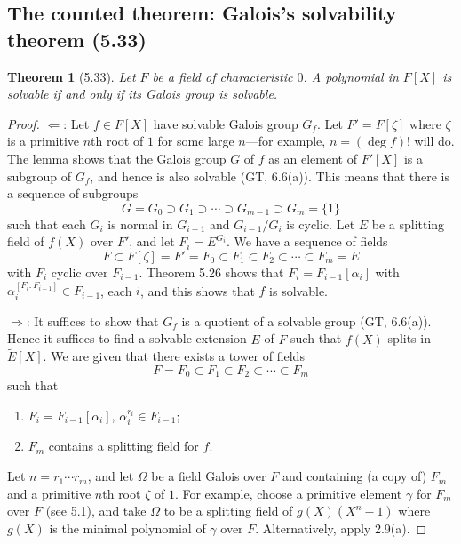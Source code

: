 \documentclass[UTF8,11pt,a4paper]{ctexart}
\newtheorem*{theorem}{Theorem}
\theoremstyle{definition}\newtheorem*{definition}{Definition}
\theoremstyle{remark}\newtheorem*{remark}{Remark}
\begin{document}
\subsection*{The counted theorem: Galois's solvability theorem (5.33)}
\begin{theorem}[5.33]
Let $F$ be a field of characteristic $0$. A polynomial in $F[X]$ is solvable if and only if its Galois group is solvable.
\end{theorem}
\begin{proof}
$\Longleftarrow$: Let $f\in F[X]$ have solvable Galois group $G_f$. Let $F'=F[\zeta]$ where $\zeta$ is a primitive $n$th root of $1$ for some large $n$---for example, $n=(\deg f)!$ will do. The lemma shows that the Galois group $G$ of $f$ as an element of $F'[X]$ is a subgroup of $G_f$, and hence is also solvable (GT, 6.6(a)). This means that there is a sequence of subgroups
\[
G=G_0\supset G_1\supset\cdots\supset G_{m-1}\supset G_m=\{1\}
\]
such that each $G_i$ is normal in $G_{i-1}$ and $G_{i-1}/G_i$ is cyclic. Let $E$ be a splitting field of $f(X)$ over $F'$, and let $F_i=E^{G_i}$. We have a sequence of fields
\[
F\subset F[\zeta]=F'=F_0\subset F_1\subset F_2\subset\cdots\subset F_m=E
\]
with $F_i$ cyclic over $F_{i-1}$. Theorem 5.26 shows that $F_i=F_{i-1}[\alpha_i]$ with $\alpha_i^{[F_i:F_{i-1}]}\in F_{i-1}$, each $i$, and this shows that $f$ is solvable.

$\Longrightarrow$: It suffices to show that $G_f$ is a quotient of a solvable group (GT, 6.6(a)). Hence it suffices to find a solvable extension $\widetilde E$ of $F$ such that $f(X)$ splits in $\widetilde E[X]$.
We are given that there exists a tower of fields
\[
F=F_0\subset F_1\subset F_2\subset\cdots\subset F_m
\]
such that
\begin{enumerate}[label=(\alph*)]
\item $F_i=F_{i-1}[\alpha_i]$, $\alpha_i^{r_i}\in F_{i-1}$;
\item $F_m$ contains a splitting field for $f$.
\end{enumerate}
Let $n=r_1\cdots r_m$, and let $\Omega$ be a field Galois over $F$ and containing (a copy of) $F_m$ and a primitive $n$th root $\zeta$ of $1$. For example, choose a primitive element $\gamma$ for $F_m$ over $F$ (see 5.1), and take $\Omega$ to be a splitting field of $g(X)(X^n-1)$ where $g(X)$ is the minimal polynomial of $\gamma$ over $F$. Alternatively, apply 2.9(a).


\end{proof}
\end{document}
